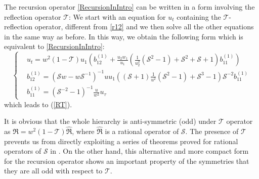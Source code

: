\documentclass{article}
\numberwithin{equation}{section}
\newcommand\cS{{\mathcal S}}
\newcommand\cT{{\mathcal T}}
\begin{document}
The recursion operator \eqref{RecursionInIntro} can be written in a form involving the reflection operator $\cT$:
We start with an equation for $u_t$ containing the 
$\mathcal{T}$-reflection operator, different from \eqref{r12} and
we then solve all the other equations in the same way as before. In this way, we obtain the following form 
which is equivalent to \eqref{RecursionInIntro}:
	\begin{equation*}
		\begin{cases}
			&u_t = w^2 (1-\mathcal{T}) u_1 
\left(b^{(1)}_{12}+\frac{u_2 w_1}{u_1} 
\left(\frac{1}{u_2^2}\left(\mathcal{S}^2-1\right)+\mathcal{S}^2+\mathcal{S}
+1\right) b^{(1)}_{11}\right)\\
			& b^{(1)}_{1 2}= \left( \mathcal{S} w - w 
\mathcal{S}^{-1} \right)^{-1} u u_1 \left( \left( \mathcal{S}+1 
\right)\frac{1}{u^2}\left( \mathcal{S}^2-1\right) + \mathcal{S}^3-1\right) \cS^{-2}
b^{(1)}_{    11} \\
			& b^{(1)}_{    
11}=(\mathcal{S}^{-2}-1)^{-1}\frac{u}{w^2}u_\tau
		\end{cases}
		\label{5.6bis}
	\end{equation*}
which leads to (\ref{RT}).

It is obvious that the whole hierarchy is anti-symmetric (odd) under
$\mathcal{T}$ operator as $\mathfrak{R} = w^2 (1-\mathcal{T})
\hat{\mathfrak{R}}$, where $\hat{\mathfrak{R}}$ is a rational operator of $\cS$.
The presence of $\mathcal{T}$ prevents us from directly exploiting a series of
theorems proved for rational operators of $\cS$ in \cite{4}. On the other hand, this
alternative and more compact form for the recursion operator shows an important property of the
symmetries that they are all odd with respect to $\mathcal{T}$.
\end{document}
